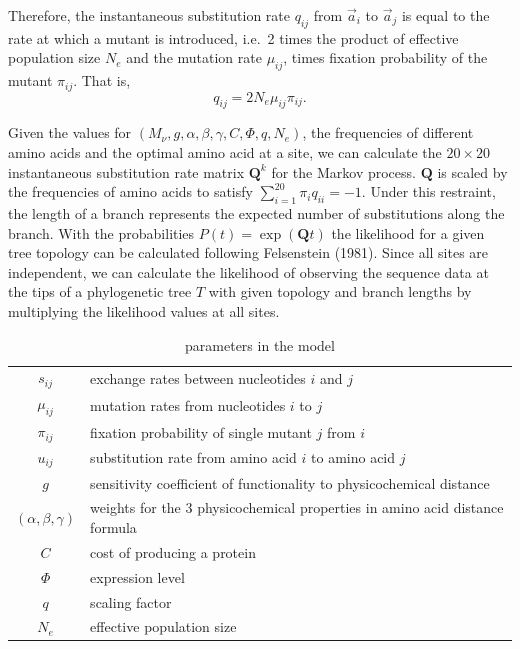 \documentclass[13pt]{article}
\newcommand{\avec}{\ensuremath{\vec{a}}\xspace}
\newcommand{\Qmat}{\ensuremath{\mathbf{Q}}\xspace}
\begin{document}
Therefore, the instantaneous substitution rate $q_{ij}$ from $\avec_i$ to $\avec_j$ is equal to the rate at which a mutant is introduced, i.e.~2 times the product of effective population size $N_e$ and the mutation rate $\mu_{ij}$, times fixation probability of the mutant $\pi_{ij}$.
That is,
\begin{equation}
q_{ij} = 2N_e \mu_{ij} \pi_{ij}.
\label{eq:subrate}
\end{equation}


Given the values for $\left(M_{\nu},g, \alpha, \beta, \gamma, C, \Phi, q, N_e\right)$, the frequencies of different amino acids and the optimal amino acid at a site, we can calculate the $20 \times 20$ instantaneous substitution rate matrix $\Qmat^k$ for the Markov process. 
$\Qmat$ is scaled by the frequencies of amino acids to satisfy $\sum_{i=1}^{20} \pi_i q_{ii}= -1$.
Under this restraint, the length of a branch represents the expected number of substitutions along the branch.
With the probabilities $P(t)  = \exp\left(\Qmat t\right)$ the likelihood for a given tree topology can be calculated following Felsenstein (1981).
Since all sites are independent, we can calculate the likelihood of observing the sequence data at the tips of a phylogenetic tree $T$ with given topology and branch lengths by multiplying the likelihood values at all sites.\\

\begin{table}[h]
\centering
\caption{parameters in the model}
\begin{tabular}{ c p{10cm} }
\hline
$s_{ij}$ & exchange rates between nucleotides $i$ and $j$ \\
$\mu_{ij}$ & mutation rates from nucleotides $i$ to $j$\\
$\pi_{ij}$ & fixation probability of single mutant $j$ from $i$\\
$u_{ij}$ & substitution rate from amino acid $i$ to amino acid $j$\\
$g$       & sensitivity coefficient of functionality to physicochemical distance \\
$(\alpha,\beta,\gamma)$ & weights for the 3 physicochemical properties in amino acid distance formula \\
$C$ & cost of producing a protein\\
$\Phi$ & expression level \\
$q$ & scaling factor \\
$N_e$ & effective population size \\
\hline
\end{tabular}

\label{tb: para}
\end{table}
\end{document}
